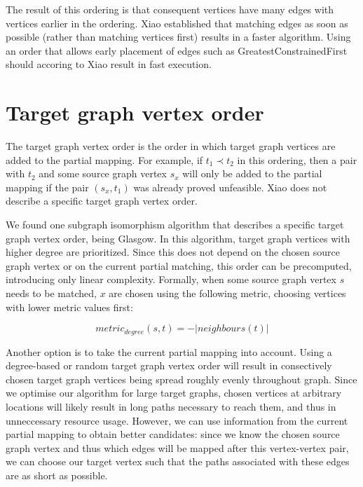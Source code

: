 The result of this ordering is that consequent vertices have many edges with vertices earlier in the ordering. Xiao established that matching edges as soon as possible (rather than matching vertices first) results in a faster algorithm. Using an order that allows early placement of edges such as GreatestConstrainedFirst should accoring to Xiao result in fast execution.
\section{Target graph vertex order}
\label{sec:targetOrder}

The target graph vertex order is the order in which target graph vertices are added to the partial mapping. For example, if $t_1 \prec t_2$ in this ordering, then a pair with $t_2$ and some source graph vertex $s_x$ will only be added to the partial mapping if the pair $(s_x, t_1)$ was already proved unfeasible. Xiao does not describe a specific target graph vertex order.

We found one subgraph isomorphism algorithm that describes a specific target graph vertex order, being Glasgow\cite{McCreesh2015}. In this algorithm, target graph vertices with higher degree are prioritized. Since this does not depend on the chosen source graph vertex or on the current partial matching, this order can be precomputed, introducing only linear complexity. Formally, when some source graph vertex $s$ needs to be matched, $x$ are chosen using the following metric, choosing vertices with lower metric values first:

$$\mathit{metric}_\mathit{degree}(s, t)=-|\mathit{neighbours}(t)|$$

Another option is to take the current partial mapping into account. Using a degree-based or random target graph vertex order will result in consectively chosen target graph vertices being spread roughly evenly throughout graph. Since we optimise our algorithm for large target graphs, chosen vertices at arbitrary locations will likely result in long paths necessary to reach them, and thus in unneccessary resource usage. However, we can use information from the current partial mapping to obtain better candidates: since we know the chosen source graph vertex and thus which edges will be mapped after this vertex-vertex pair, we can choose our target vertex such that the paths associated with these edges are as short as possible.

